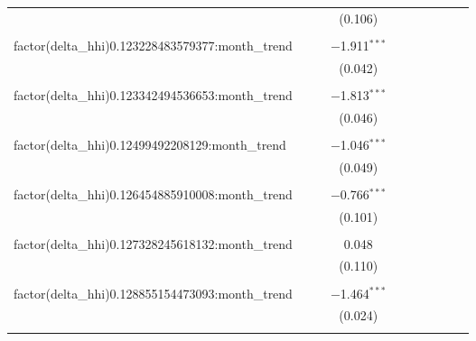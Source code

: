 \begin{table}[H]
{\begin{tabular}{@{\extracolsep{5pt}}lccccccccc}
   &  &  & (0.106) &  &  &  &  &  &  \\  

   & & & & & & & & & \\  

  factor(delta\_hhi)0.123228483579377:month\_trend &  &  & $-$1.911$^{***}$ &  &  &  &  &  &  \\  

   &  &  & (0.042) &  &  &  &  &  &  \\  

   & & & & & & & & & \\  

  factor(delta\_hhi)0.123342494536653:month\_trend &  &  & $-$1.813$^{***}$ &  &  &  &  &  &  \\  

   &  &  & (0.046) &  &  &  &  &  &  \\  

   & & & & & & & & & \\  

  factor(delta\_hhi)0.12499492208129:month\_trend &  &  & $-$1.046$^{***}$ &  &  &  &  &  &  \\  

   &  &  & (0.049) &  &  &  &  &  &  \\  

   & & & & & & & & & \\  

  factor(delta\_hhi)0.126454885910008:month\_trend &  &  & $-$0.766$^{***}$ &  &  &  &  &  &  \\  

   &  &  & (0.101) &  &  &  &  &  &  \\  

   & & & & & & & & & \\  

  factor(delta\_hhi)0.127328245618132:month\_trend &  &  & 0.048 &  &  &  &  &  &  \\  

   &  &  & (0.110) &  &  &  &  &  &  \\  

   & & & & & & & & & \\  

  factor(delta\_hhi)0.128855154473093:month\_trend &  &  & $-$1.464$^{***}$ &  &  &  &  &  &  \\  

   &  &  & (0.024) &  &  &  &  &  &  \\  

   & & & & & & & & & \\  


\end{tabular}}
\end{table}
